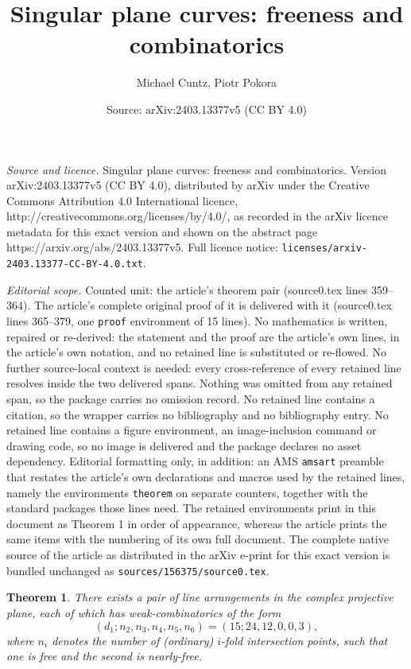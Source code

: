 \documentclass[10pt,a4paper]{amsart}
\title{Singular plane curves: freeness and combinatorics}
\author{Michael Cuntz, Piotr Pokora}
\date{Source: arXiv:2403.13377v5 (CC BY 4.0)}
\newtheorem{theorem}{Theorem}
\begin{document}
\maketitle

\noindent\emph{Source and licence.} Singular plane curves: freeness and combinatorics. Version arXiv:2403.13377v5 (CC BY 4.0), distributed by arXiv under the Creative Commons Attribution 4.0 International licence, http://creativecommons.org/licenses/by/4.0/, as recorded in the arXiv licence metadata for this exact version and shown on the abstract page https://arxiv.org/abs/2403.13377v5. Full licence notice: \texttt{licenses/arxiv-2403.13377-CC-BY-4.0.txt}.\par\smallskip

\noindent\textit{Editorial scope.} Counted unit: the article's theorem pair (source0.tex lines 359--364). The article's complete original proof of it is delivered with it (source0.tex lines 365--379, one \texttt{proof} environment of 15 lines). No mathematics is written, repaired or re-derived: the statement and the proof are the article's own lines, in the article's own notation, and no retained line is substituted or re-flowed.  No further source-local context is needed: every cross-reference of every retained line resolves inside the two delivered spans.  Nothing was omitted from any retained span, so the package carries no omission record.  No retained line contains a citation, so the wrapper carries no bibliography and no bibliography entry.  No retained line contains a figure environment, an image-inclusion command or drawing code, so no image is delivered and the package declares no asset dependency.  Editorial formatting only, in addition: an AMS \texttt{amsart} preamble that restates the article's own declarations and macros used by the retained lines, namely the environments \texttt{theorem} on separate counters, together with the standard packages those lines need.  The retained environments print in this document as Theorem 1 in order of appearance, whereas the article prints the same items with the numbering of its own full document.  The complete native source of the article as distributed in the arXiv e-print for this exact version is bundled unchanged as \texttt{sources/156375/source0.tex}.
\begin{theorem}
\label{pair}
There exists a pair of line arrangements in the complex projective plane, each of which has weak-combinatorics of the form
$$(d_{1};n_{2},n_{3},n_{4},n_{5},n_{6}) = (15; 24 ,12, 0, 0, 3),$$
where $n_{i}$ denotes the number of (ordinary) $i$-fold intersection points, such that one is free and the second is nearly-free.
\end{theorem}
\end{document}
